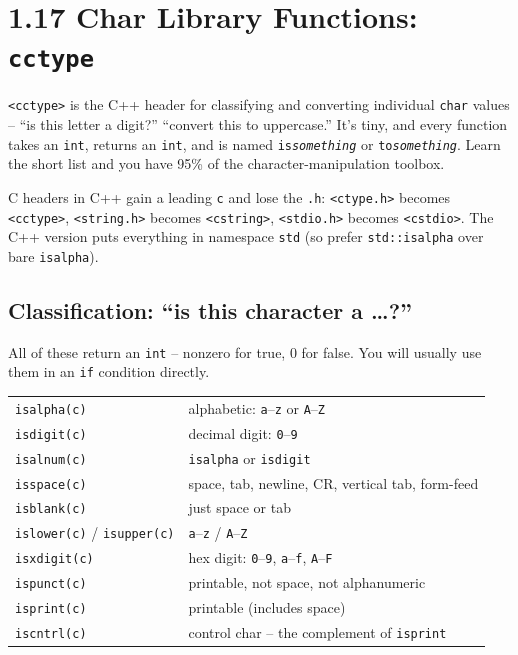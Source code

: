 \documentclass[11pt]{article}
\begin{document}
\section{1.17 Char Library Functions: \texttt{cctype}}

\texttt{<cctype>} is the C++ header for classifying and converting
individual \texttt{char} values -- ``is this letter a digit?'' ``convert
this to uppercase.'' It's tiny, and every function takes an
\texttt{int}, returns an \texttt{int}, and is named
\texttt{is\textit{something}} or \texttt{to\textit{something}}. Learn
the short list and you have 95\% of the character-manipulation toolbox.

\begin{defnbox}
C headers in C++ gain a leading \texttt{c} and lose the \texttt{.h}:
\texttt{<ctype.h>} becomes \texttt{<cctype>},
\texttt{<string.h>} becomes \texttt{<cstring>},
\texttt{<stdio.h>} becomes \texttt{<cstdio>}. The C++ version puts
everything in namespace \texttt{std} (so prefer \texttt{std::isalpha}
over bare \texttt{isalpha}).
\end{defnbox}

\subsection{Classification: ``is this character a \ldots?''}

All of these return an \texttt{int} -- nonzero for true, 0 for false.
You will usually use them in an \texttt{if} condition directly.

\begin{center}
\small
\begin{tabular}{ll}
\texttt{isalpha(c)} & alphabetic: \texttt{a}--\texttt{z} or \texttt{A}--\texttt{Z} \\
\texttt{isdigit(c)} & decimal digit: \texttt{0}--\texttt{9} \\
\texttt{isalnum(c)} & \texttt{isalpha} or \texttt{isdigit} \\
\texttt{isspace(c)} & space, tab, newline, CR, vertical tab, form-feed \\
\texttt{isblank(c)} & just space or tab \\
\texttt{islower(c)} / \texttt{isupper(c)} & \texttt{a}--\texttt{z} / \texttt{A}--\texttt{Z} \\
\texttt{isxdigit(c)} & hex digit: \texttt{0}--\texttt{9}, \texttt{a}--\texttt{f}, \texttt{A}--\texttt{F} \\
\texttt{ispunct(c)} & printable, not space, not alphanumeric \\
\texttt{isprint(c)} & printable (includes space) \\
\texttt{iscntrl(c)} & control char -- the complement of \texttt{isprint} \\
\end{tabular}
\normalsize
\end{center}
\end{document}
